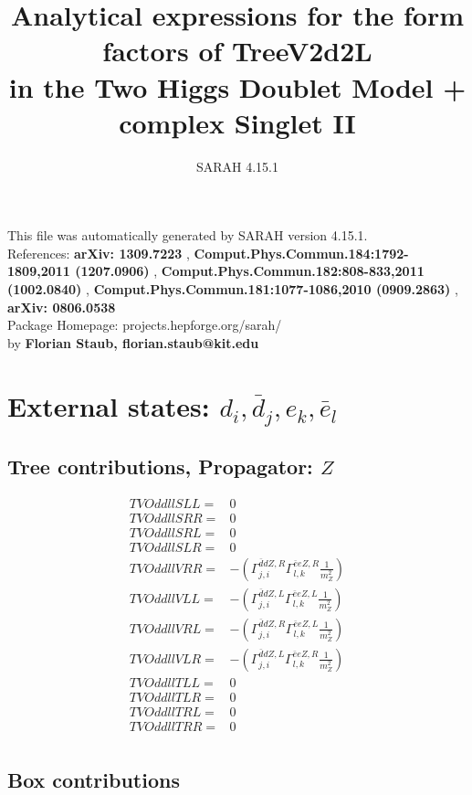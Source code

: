 \documentclass[A4,landscape]{article}
\begin{document}
\title{Analytical expressions for the form factors of TreeV2d2L\\ in the Two Higgs Doublet Model + complex Singlet II } 
 \author{SARAH 4.15.1} 
 \maketitle 
 \vspace{10cm} 
This file was automatically generated by SARAH version 4.15.1.  \\ 
References: {\bf arXiv: 1309.7223 }, {\bf Comput.Phys.Commun.184:1792-1809,2011 (1207.0906) }, {\bf Comput.Phys.Commun.182:808-833,2011 (1002.0840) }, {\bf Comput.Phys.Commun.181:1077-1086,2010 (0909.2863) }, {\bf arXiv: 0806.0538 } \\ 
Package Homepage: projects.hepforge.org/sarah/ \\ 
by {\bf Florian Staub, florian.staub@kit.edu} 
 \pagebreak 
 \tableofcontents 
 \pagebreak 
\section{External states: ${d_{{i}}, \bar{d}_{{j}}, e_{{k}}, \bar{e}_{{l}}}$} 
\subsection{Tree contributions, Propagator: $Z$} 

\begin{align} 
  TVOddllSLL= & 0 \\ 
  TVOddllSRR= & 0 \\ 
  TVOddllSRL= & 0 \\ 
  TVOddllSLR= & 0 \\ 
  TVOddllVRR= & -(\Gamma^{\bar{d}d Z ,R}_{j, i} \Gamma^{\bar{e}e Z ,R}_{l, k} \frac{1}{m^2_{Z}}) \\ 
  TVOddllVLL= & -(\Gamma^{\bar{d}d Z ,L}_{j, i} \Gamma^{\bar{e}e Z ,L}_{l, k} \frac{1}{m^2_{Z}}) \\ 
  TVOddllVRL= & -(\Gamma^{\bar{d}d Z ,R}_{j, i} \Gamma^{\bar{e}e Z ,L}_{l, k} \frac{1}{m^2_{Z}}) \\ 
  TVOddllVLR= & -(\Gamma^{\bar{d}d Z ,L}_{j, i} \Gamma^{\bar{e}e Z ,R}_{l, k} \frac{1}{m^2_{Z}}) \\ 
  TVOddllTLL= & 0 \\ 
  TVOddllTLR= & 0 \\ 
  TVOddllTRL= & 0 \\ 
  TVOddllTRR= & 0 \\ 
\end{align} 
\subsection{Box contributions} 
\end{document}
